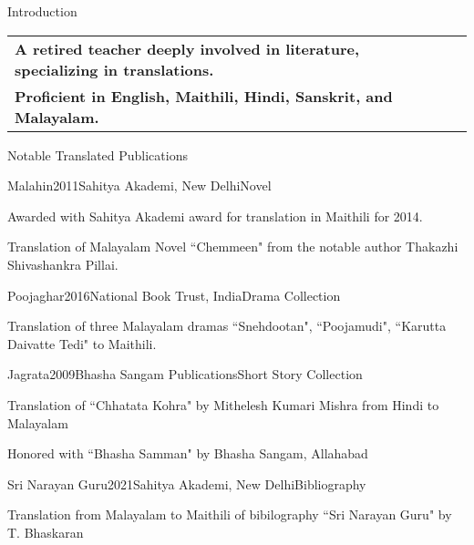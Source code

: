 \documentclass{resume} %
\makeatletter
\newcommand{\tableEnv}[2]{%
  \begin{rSection}{#1} %
    \begin{adjustwidth}{0.0in}{0.1in} %
      \begin{tabularx}{\linewidth}{@{} >{\bfseries}l @{\hspace{6ex}} X @{}}
        #2 %
      \end{tabularx}
    \end{adjustwidth}
  \end{rSection}
}
\makeatother
\begin{document}

\tableEnv{Introduction}{
	{\normalfont A retired teacher deeply involved in literature, specializing in translations. } \\ 
	{\normalfont Proficient in English, Maithili, Hindi, Sanskrit, and Malayalam. }
}


\begin{rSection}{Notable Translated Publications}
	
	\begin{rSubsection}{Malahin}{2011}{Sahitya Akademi, New Delhi}{Novel}
		\item Awarded with Sahitya Akademi award for translation in Maithili for 2014.
		\item Translation of Malayalam Novel ``Chemmeen" from the notable author Thakazhi Shivashankra Pillai.
	\end{rSubsection}
	
	\begin{rSubsection}{Poojaghar}{2016}{National Book Trust, India}{Drama Collection}
		\item Translation of three Malayalam dramas ``Snehdootan",  ``Poojamudi", ``Karutta Daivatte Tedi" to Maithili.
		
	\end{rSubsection}
	
	\begin{rSubsection}{Jagrata}{2009}{Bhasha Sangam Publications}{Short Story Collection}
		\item Translation of ``Chhatata Kohra" by Mithelesh Kumari Mishra from Hindi to Malayalam
		\item  Honored with ``Bhasha Samman" by Bhasha Sangam, Allahabad
	\end{rSubsection}
	
	\begin{rSubsection}{Sri Narayan Guru}{2021}{Sahitya Akademi, New Delhi}{Bibliography}
		\item Translation from Malayalam to Maithili of bibilography ``Sri Narayan Guru" by T. Bhaskaran
		
	\end{rSubsection}
	
\end{rSection}
\end{document}
